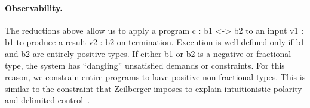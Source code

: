 \documentclass[preprint]{sigplanconf}
\begin{document}






\paragraph*{Observability.} 

The reductions above allow us to apply a program {{c : b1 <-> b2}} to an
input {{v1 : b1}} to produce a result {{v2 : b2}} on termination. Execution
is well defined only if {{b1}} and {{b2}} are entirely positive types. If
either {{b1}} or {{b2}} is a negative or fractional type, the system has
``dangling'' unsatisfied demands or constraints. For this reason, we
constrain entire programs to have positive non-fractional types. This is
similar to the constraint that Zeilberger imposes to explain intuitionistic
polarity and delimited control~\cite{10.1109/LICS.2010.23}.
\end{document}
